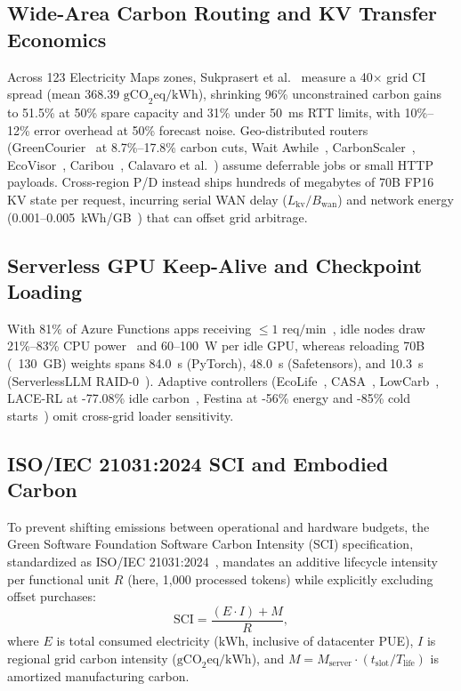 \subsection{Wide-Area Carbon Routing and KV Transfer Economics}\label{subsec:bg_wan}
Across 123 Electricity Maps zones, Sukprasert et al.~\cite{sukprasert2024limitations} measure a 40$\times$ grid CI spread (mean $368.39\text{ gCO}_2\text{eq/kWh}$), shrinking 96\% unconstrained carbon gains to 51.5\% at 50\% spare capacity and 31\% under \SI{50}{\milli\second} RTT limits, with 10\%--12\% error overhead at 50\% forecast noise. Geo-distributed routers (GreenCourier~\cite{chadha2023greencourier} at 8.7\%--17.8\% carbon cuts, Wait Awhile~\cite{wiesner2021letswait}, CarbonScaler~\cite{hanafy2023carbonscaler}, EcoVisor~\cite{souza2023ecovisor}, Caribou~\cite{gsteiger2024caribou}, Calavaro et al.~\cite{calavaro2026offloading}) assume deferrable jobs or small HTTP payloads. Cross-region P/D instead ships hundreds of megabytes of 70B FP16 KV state per request, incurring serial WAN delay ($L_{\text{kv}}/B_{\text{wan}}$) and network energy (0.001--0.005~kWh/GB~\cite{gsteiger2024caribou}) that can offset grid arbitrage.

\subsection{Serverless GPU Keep-Alive and Checkpoint Loading}\label{subsec:bg_serverless}
With 81\% of Azure Functions apps receiving $\le 1\text{ req/min}$~\cite{shahrad2020serverless}, idle nodes draw 21\%--83\% CPU power~\cite{sun2026lacere} and 60--100~W per idle GPU, whereas reloading 70B (~130~GB) weights spans 84.0~s (PyTorch), 48.0~s (Safetensors), and 10.3~s (ServerlessLLM RAID-0~\cite{fu2024serverlessllm}). Adaptive controllers (EcoLife~\cite{jiang2024ecolife}, CASA~\cite{qi2024casa}, LowCarb~\cite{roy2026lowcarb}, LACE-RL at -77.08\% idle carbon~\cite{sun2026lacere}, Festina at -56\% energy and -85\% cold starts~\cite{wang2026festina}) omit cross-grid loader sensitivity.

\subsection{ISO/IEC 21031:2024 SCI and Embodied Carbon}\label{subsec:bg_sci}
To prevent shifting emissions between operational and hardware budgets, the Green Software Foundation Software Carbon Intensity (SCI) specification, standardized as ISO/IEC 21031:2024~\cite{iso2024sci}, mandates an additive lifecycle intensity per functional unit $R$ (here, 1,000 processed tokens) while explicitly excluding offset purchases:
\begin{equation}\label{eq:sci}
\text{SCI} = \frac{(E \cdot I) + M}{R},
\end{equation}
where $E$ is total consumed electricity ($\text{kWh}$, inclusive of datacenter PUE), $I$ is regional grid carbon intensity ($\text{gCO}_2\text{eq/kWh}$), and $M = M_{\text{server}} \cdot (t_{\text{slot}}/T_{\text{life}})$ is amortized manufacturing carbon.

